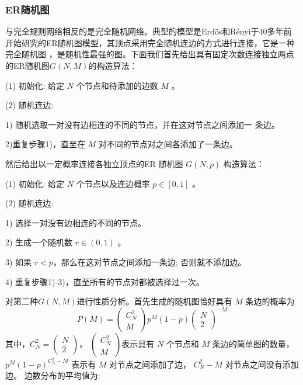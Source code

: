 \subsubsection{ER随机图}
与完全规则网络相反的是完全随机网络。典型的模型是Erdös和Rényi于40多年前开始研究的ER随机图模型，其顶点采用完全随机连边的方式进行连接，它是一种完全随机图
，是随机性最强的图。下面我们首先给出具有固定次数连接独立两点的ER随机图$G(N,M)$的构造算法：\par 
\noindent(1) 初始化: 给定 $N$ 个节点和待添加的边数 $M$ 。\par
\noindent(2) 随机连边:\par
1) 随机选取一对没有边相连的不同的节点，并在这对节点之间添加一 条边。\par
2)重复步骤1)，直至在 $M$ 对不同的节点对之间各添加了一条边。\par
然后给出以一定概率连接各独立顶点的ER 随机图 $G(N,p)$ 构造算法：\par
\noindent(1) 初始化: 给定 $N$ 个节点以及连边概率 $p \in[0,1]$ 。\par
\noindent(2) 随机连边:\par
1) 选择一对没有边相连的不同的节点。\par
2) 生成一个随机数 $r \in(0,1)$ 。\par
3) 如果 $r<p$，那么在这对节点之间添加一条边; 否则就不添加边。\par
4) 重复步骤1)-3)，直至所有的节点对都被选择过一次。\par
对第二种$G(N,M)$进行性质分析。首先生成的随机图恰好具有 $M$ 条边的概率为
\begin{equation}
    P(M)=\left(\begin{array}{c}
    C^2_N \\
    M
    \end{array}\right) p^M(1-p)\left(\begin{array}{c}
    N \\
    2
    \end{array}\right)^{-M}
\end{equation}
其中，$C^2_N=\left(\begin{array}{c}
    N \\
    2
    \end{array}\right)$，
$\left(\begin{array}{c}
    C^2_N \\
    M
    \end{array}\right)$表示具有 $N$ 个节点和 $M$ 条边的简单图的数量，
    $p^M(1-p)^{C^2_N-M}$ 
表示有 $M$ 对节点之间添加了边， $C^2_N-M$ 对节点之间没有添加边。
边数分布的平均值为:

